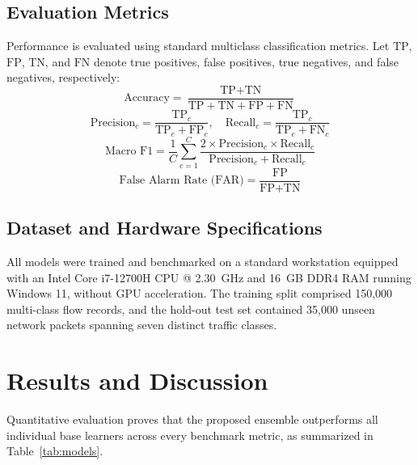 \documentclass[conference]{IEEEtran}
\begin{document}
\subsection{Evaluation Metrics}
Performance is evaluated using standard multiclass classification metrics. Let $\text{TP}$, $\text{FP}$, $\text{TN}$, and $\text{FN}$ denote true positives, false positives, true negatives, and false negatives, respectively:
\begin{equation}
\text{Accuracy} = \frac{\text{TP} + \text{TN}}{\text{TP} + \text{TN} + \text{FP} + \text{FN}}
\end{equation}
\begin{equation}
\text{Precision}_c = \frac{\text{TP}_c}{\text{TP}_c + \text{FP}_c}, \quad \text{Recall}_c = \frac{\text{TP}_c}{\text{TP}_c + \text{FN}_c}
\end{equation}
\begin{equation}
\text{Macro F1} = \frac{1}{C} \sum_{c=1}^C \frac{2 \times \text{Precision}_c \times \text{Recall}_c}{\text{Precision}_c + \text{Recall}_c}
\end{equation}
\begin{equation}
\text{False Alarm Rate (FAR)} = \frac{\text{FP}}{\text{FP} + \text{TN}}
\end{equation}

\subsection{Dataset and Hardware Specifications}
All models were trained and benchmarked on a standard workstation equipped with an Intel Core i7-12700H CPU @ 2.30~GHz and 16~GB DDR4 RAM running Windows 11, without GPU acceleration. The training split comprised 150,000 multi-class flow records, and the hold-out test set contained 35,000 unseen network packets spanning seven distinct traffic classes.

\section{Results and Discussion}
Quantitative evaluation proves that the proposed ensemble outperforms all individual base learners across every benchmark metric, as summarized in Table~\ref{tab:models}.
\end{document}
